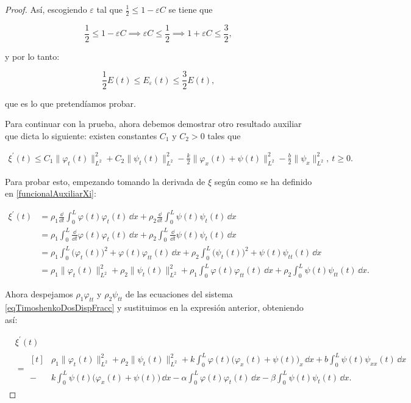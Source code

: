 \begin{proof}
    Así, escogiendo $\varepsilon$ tal que $\frac{1}{2} \leq 1 - \varepsilon C$ se tiene que

    \[\frac{1}{2} \leq 1 - \varepsilon C \implies \varepsilon C \leq \frac{1}{2} \implies 1 + \varepsilon C \leq \frac{3}{2},\]

    y por lo tanto:

    \[\frac{1}{2}E(t) \leq E_\varepsilon(t) \leq \frac{3}{2}E(t),\]

    que es lo que pretendíamos probar. 

    Para continuar con la prueba, ahora debemos demostrar otro resultado auxiliar que dicta lo siguiente: existen constantes $C_1$ y $C_2 > 0$ tales que

    \begin{align}
        \label{afirmacion2}
        \xi^\prime(t) \leq C_1\lVert \varphi_t(t)\rVert^2_{L^2} + C_2\lVert \psi_t(t)\rVert^2_{L^2} - \frac{k}{2}\lVert \varphi_x(t) + \psi(t)\rVert^2_{L^2} - \frac{b}{2}\lVert \psi_x \rVert_{L^2}^2, \ t \geq 0.
    \end{align}

    Para probar esto, empezando tomando la derivada de $\xi$ según como se ha definido en \eqref{funcionalAuxiliarXi}:

    \begin{align*}
        \xi^\prime(t) &= \rho_1\frac{\dd}{\dd t} \int_0^L \varphi(t)\varphi_t(t) \, \dd x + \rho_2\frac{\dd}{\dd t}\int_0^L\psi(t) \psi_t(t) \, \dd x\\
        &= \rho_1 \int_0^L \frac{\dd}{\dd t}\varphi(t)\varphi_t(t) \, \dd x + \rho_2\int_0^L \frac{\dd}{\dd t}\psi(t) \psi_t(t) \, \dd x\\
        &= \rho_1\int_0^L \big(\varphi_t(t)\big)^2 + \varphi(t)\varphi_{tt}(t) \, \dd x + \rho_2\int_0^L \big(\psi_t(t)\big)^2 + \psi(t)\psi_{tt}(t) \, \dd x\\
        &=\rho_1\lVert \varphi_t(t)\rVert^2_{L^2} + \rho_2\lVert \psi_t(t)\rVert^2_{L^2} + \rho_1\int_0^L\varphi(t)\varphi_{tt}(t) \, \dd x + \rho_2\int_0^L\psi(t)\psi_{tt}(t) \, \dd x.
    \end{align*}

    Ahora despejamos $\rho_1\varphi_{tt}$ y $\rho_2\psi_{tt}$ de las ecuaciones del sistema \eqref{eqTimoshenkoDosDispFracc} y sustituimos en la expresión anterior, obteniendo así:

    \begin{align*}
        &\xi^\prime(t)\\
        &=\begin{aligned}[t]
            &\rho_1\lVert \varphi_t(t)\rVert^2_{L^2} + \rho_2\lVert \psi_t(t)\rVert^2_{L^2} + k\int_0^L\varphi(t)\big(\varphi_x(t) + \psi(t)\big)_x \, \dd x + b\int_0^L\psi(t)\psi_{xx}(t) \, \dd x\\
            -&k\int_0^L\psi(t)\big(\varphi_x(t) + \psi(t)\big) \, \dd x - \alpha\int_0^L\varphi(t)\varphi_t(t) \, \dd x - \beta\int_0^L\psi(t)\psi_t(t)\, \dd x.
        \end{aligned}
    \end{align*}
    

\end{proof}
